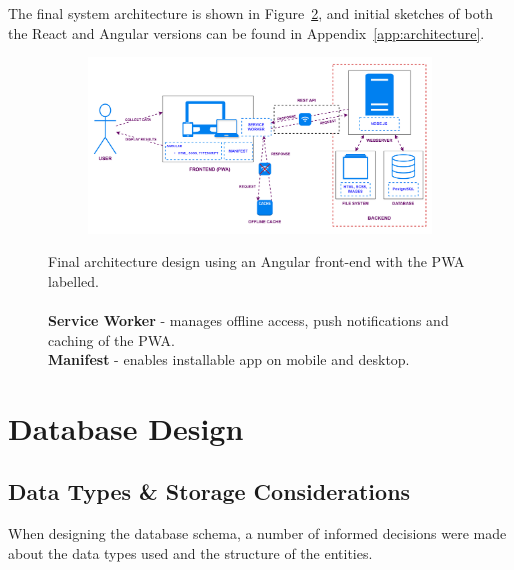 \documentclass{l4proj}
\begin{document}
The final system architecture is shown in Figure~\ref{fig:architecture}, and initial sketches of both the React and Angular versions can be found in Appendix~\ref{app:architecture}.

\begin{figure}[htb] 
    \centering
    \begin{subfigure}[b]{\textwidth}
        \includegraphics[width=\textwidth]{images/Architecture-Diagrams/final-architecture-diagram.png}
        \label{fig:syn1}
    \end{subfigure}   
    \caption{Final architecture design using an Angular front-end with the PWA labelled. \\ \\
    \textbf{Service Worker} - manages offline access, push notifications and caching of the PWA. \\
    \textbf{Manifest} - enables installable app on mobile and desktop.}
    \label{fig:architecture}
\end{figure}


\section{Database Design}
\subsection{Data Types \& Storage Considerations}
When designing the database schema, a number of informed decisions were made about the data types used and the structure of the entities.
\end{document}
